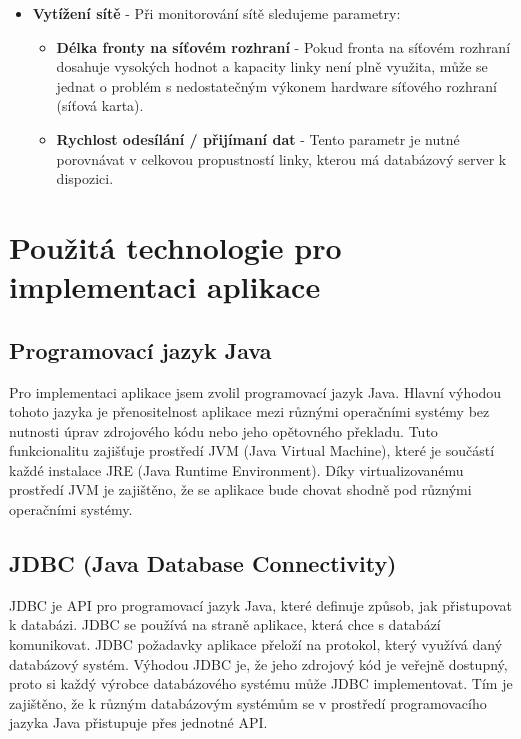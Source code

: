 \documentclass[czech,bachelor,public,dept460,male,cpdeclaration,twoside]{diploma}
\begin{document}
\begin{itemize}
  \item \textbf{Vytížení sítě} - Při monitorování sítě sledujeme parametry:
  \begin{itemize}
  	\item \textbf{Délka fronty na síťovém rozhraní} - Pokud fronta na síťovém rozhraní dosahuje vysokých hodnot a kapacity linky není plně využita, může se jednat o problém s nedostatečným výkonem hardware síťového rozhraní (síťová karta).
  	\item \textbf{Rychlost odesílání / přijímaní dat} - Tento parametr je nutné porovnávat v celkovou propustností linky, kterou má databázový server k dispozici. 
  \end{itemize}
\end{itemize}


\section{Použitá technologie pro implementaci aplikace} \label{tech}

\subsection{Programovací jazyk Java}
Pro implementaci aplikace jsem zvolil programovací jazyk Java. Hlavní výhodou tohoto jazyka je přenositelnost aplikace mezi různými operačními systémy bez nutnosti úprav zdrojového kódu nebo jeho opětovného překladu. Tuto funkcionalitu zajišťuje prostředí JVM (Java Virtual Machine), které je součástí každé instalace JRE (Java Runtime Environment). Díky virtualizovanému prostředí JVM je zajištěno, že se aplikace bude chovat shodně pod různými operačními systémy.

\subsection{JDBC (Java Database Connectivity)} \label{jdbc}
JDBC je API pro programovací jazyk Java, které definuje způsob, jak přistupovat k databázi. JDBC se používá na straně aplikace, která chce s databází komunikovat. JDBC požadavky aplikace přeloží na protokol, který využívá daný databázový systém. Výhodou JDBC je, že jeho zdrojový kód je veřejně dostupný, proto si každý výrobce databázového systému může JDBC implementovat. Tím je zajištěno, že k různým databázovým systémům se v prostředí programovacího jazyka Java přistupuje přes jednotné API.
\end{document}
